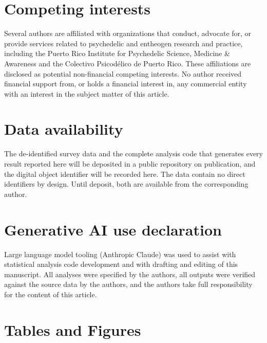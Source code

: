 \documentclass[12pt]{article}
\begin{document}
\section*{Competing interests}
Several authors are affiliated with organizations that conduct, advocate for, or provide services related
to psychedelic and entheogen research and practice, including the Puerto Rico Institute for Psychedelic
Science, Medicine \& Awareness and the Colectivo Psicod\'elico de Puerto Rico. These affiliations are
disclosed as potential non-financial competing interests. No author received financial support from, or
holds a financial interest in, any commercial entity with an interest in the subject matter of this
article.

\section*{Data availability}
The de-identified survey data and the complete analysis code that generates every result reported here will
be deposited in a public repository on publication, and the digital object identifier will be recorded
here. The data contain no direct identifiers by design. Until deposit, both are available from the
corresponding author.

\section*{Generative AI use declaration}
Large language model tooling (Anthropic Claude) was used to assist with statistical analysis code
development and with drafting and editing of this manuscript. All analyses were specified by the authors,
all outputs were verified against the source data by the authors, and the authors take full responsibility
for the content of this article.



\clearpage

\section*{Tables and Figures}
\end{document}
